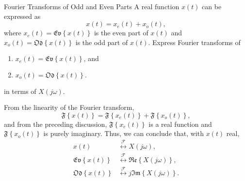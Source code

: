 \begin{frame}{Fourier Transforms of Odd and Even Parts}
    A real function $x(t)$ can be expressed as
    \begin{equation*}
        x(t) = x_e(t) + x_o(t),
    \end{equation*}
    where $x_e(t) = \mathfrak{Ev}\left\{x(t)\right\}$ is the even part of $x(t)$ and $x_o(t) = \mathfrak{Od}\left\{x(t)\right\}$ is the odd part of $x(t)$. Express Fourier transforms of 
    \begin{enumerate}
      \item $x_e(t) = \mathfrak{Ev}\left\{x(t)\right\}$, and
      \item $x_o(t) = \mathfrak{Od}\left\{x(t)\right\}$.
    \end{enumerate}
    in terms of $X(j\omega)$.
\end{frame}

\begin{frame}
    {
        From the linearity of the Fourier transform,
        \begin{equation*}
            \mathfrak{F}\left\{x(t)\right\} = \mathfrak{F}\left\{x_e(t)\right\} +\mathfrak{F}\left\{x_o(t)\right\},
        \end{equation*}
        and from the preceding discussion, $\mathfrak{F}\left\{x_e(t)\right\}$ is a real function and $\mathfrak{F}\left\{x_o(t)\right\}$ is purely imaginary. Thus, we can conclude that, with $x(t)$ real,
        \pause
        \begin{align*}
            x(t) &\overset{\mathcal{F}}{\longleftrightarrow} X(j\omega),\\
            \mathfrak{Ev}\left\{x(t)\right\} &\overset{\mathcal{F}}{\longleftrightarrow} \mathfrak{Re}\left\{X(j\omega)\right\},\\
            \mathfrak{Od}\left\{x(t)\right\} &\overset{\mathcal{F}}{\longleftrightarrow} j\mathfrak{Im}\left\{X(j\omega)\right\}.
        \end{align*}
    }
\end{frame}


